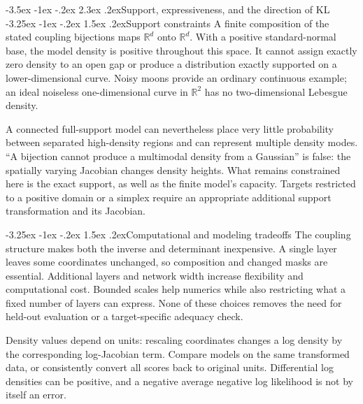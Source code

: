 \documentclass[11pt,a4paper]{article}
\makeatletter
\newcommand{\R}{\mathbb R}
\renewcommand\section{\@startsection{section}{1}{\z@}%
  {-3.5ex \@plus -1ex \@minus -.2ex}%
  {2.3ex \@plus .2ex}{\normalfont\Large}}
\renewcommand\subsection{\@startsection{subsection}{2}{\z@}%
  {-3.25ex \@plus -1ex \@minus -.2ex}%
  {1.5ex \@plus .2ex}{\normalfont\large}}
\makeatother
\begin{document}
\section{Support, expressiveness, and the direction of KL}
\subsection{Support constraints}
A finite composition of the stated coupling bijections maps $\R^d$ onto
$\R^d$. With a positive standard-normal base, the model density is positive
throughout this space. It cannot assign exactly zero density to an open gap
or produce a distribution exactly supported on a lower-dimensional curve.
Noisy moons provide an ordinary continuous example; an ideal noiseless
one-dimensional curve in $\R^2$ has no two-dimensional Lebesgue density.

A connected full-support model can nevertheless place very little probability
between separated high-density regions and can represent multiple density
modes. ``A bijection cannot produce a multimodal density from a Gaussian'' is
false: the spatially varying Jacobian changes density heights. What remains
constrained here is the exact support, as well as the finite model's capacity.
Targets restricted to a positive domain or a simplex require an appropriate
additional support transformation and its Jacobian.

\subsection{Computational and modeling tradeoffs}
The coupling structure makes both the inverse and determinant inexpensive.
A single layer leaves some coordinates unchanged, so composition and changed
masks are essential. Additional layers and network width increase flexibility
and computational cost. Bounded scales help numerics while also restricting
what a fixed number of layers can express. None of these choices removes the
need for held-out evaluation or a target-specific adequacy check.

Density values depend on units: rescaling coordinates changes a log density
by the corresponding log-Jacobian term. Compare models on the same transformed
data, or consistently convert all scores back to original units. Differential
log densities can be positive, and a negative average negative log likelihood
is not by itself an error.
\end{document}
